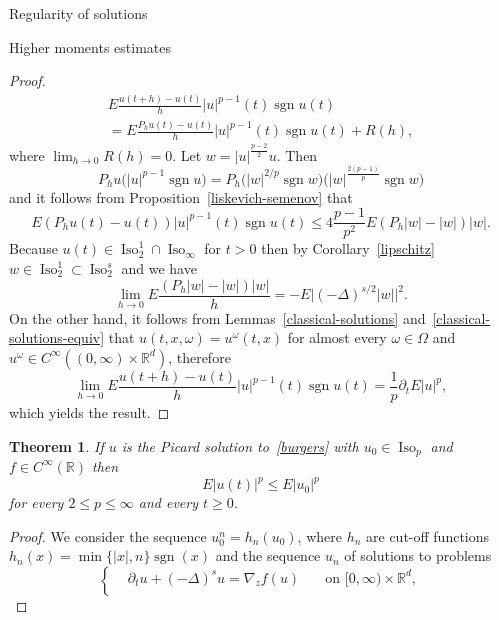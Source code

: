 \documentclass[a4paper,10pt,fleqn]{amsart}
\newtheorem{theorem}{Theorem}[section]
\theoremstyle{remark}
\theoremstyle{definition}
\DeclareMathOperator{\Iso}{Iso}
\DeclareMathOperator{\sgn}{sgn}
\newcommand{\dt} {\partial_t}
\newcommand{\grad} {\nabla_{\!z}}
\newcommand{\X} {{\mathbb{R}^d}}
\newcommand{\R} {\mathbb{R}}
\newcommand{\T} {[0,\infty)}
\renewcommand{\=} {\overset{d}{=}}
\newcommand{\fLap} {(-\Delta)^s}
\begin{document}
\begin{section}{Regularity of solutions}
\begin{subsection}{Higher moments estimates}
\begin{proof}
\begin{multline*}
      E\frac{u(t+h)-u(t)}{h}|u|^{p-1}(t)\sgn u(t) \\= E\frac{P_hu(t)-u(t)}{h}|u|^{p-1}(t)\sgn u(t) + R(h),
      \end{multline*}
      where $\lim_{h\to0}R(h) = 0$.
      Let $w = |u|^{\frac{p-2}{2}}u$. Then
      \begin{equation*}
       P_hu\big(|u|^{p-1}\sgn u\big) = P_h \big(|w|^{2/p}\sgn w\big)\big(|w|^\frac{2(p-1)}{p}\sgn w\big)
      \end{equation*}
      and it follows from Proposition~\ref{liskevich-semenov} that
      \begin{equation*}
       E(P_hu(t)-u(t))|u|^{p-1}(t)\sgn u(t) \leq 4\frac{p-1}{p^2}E(P_h |w| -|w|)|w|.
      \end{equation*}
      Because $u(t)\in\Iso^1_2\cap\Iso_\infty$ for $t>0$ then by Corollary~\ref{lipschitz} $w\in\Iso^1_2\subset\Iso^s_2$ and we have
      \begin{equation*}
        \lim_{h\to0}E\frac{(P_h |w|-|w|)|w|}{h} = -E\big|(-\Delta)^{s/2}|w|\big|^2.
      \end{equation*}
      On the other hand, it follows from Lemmas~\ref{classical-solutions} and~\ref{classical-solutions-equiv}
      that $u(t,x,\omega)=u^\omega(t,x)$ for almost every $\omega\in\Omega$
      and $u^\omega\in C^\infty((0,\infty)\times\X)$, therefore
      \begin{equation*}
      \lim_{h\to0}E\frac{u(t+h)-u(t)}{h}|u|^{p-1}(t)\sgn u(t) = \frac{1}{p}\dt E|u|^p,
      \end{equation*}
      which yields the result.
    \end{proof}
    \begin{theorem}\label{rosenblatt-lp}
     If $u$ is the Picard solution to~\eqref{burgers} with $u_0\in\Iso_p$ and $f\in C^\infty(\R)$ then
     \begin{equation*}
      E|u(t)|^p \leq E|u_0|^p
     \end{equation*}
      for every $2\leq p\leq\infty$ and every $t\geq0$.
    \end{theorem}
    \begin{proof}
     We consider the sequence $u_0^n = h_n(u_0)$, where $h_n$ are cut-off functions $h_n(x) = \min\{|x|,n\}\sgn(x)$ and the sequence $u_n$ of solutions to problems
      \begin{equation*}
      \left\{
      \begin{aligned}
        &\dt u + \fLap u = \grad f(u)\quad&\text{on $\T\times\X$}, \\

\end{aligned}
\end{equation*}
\end{proof}
\end{subsection}
\end{section}
\end{document}
